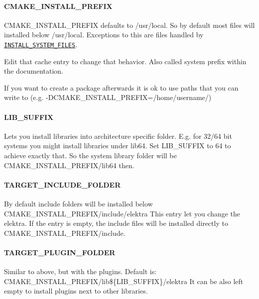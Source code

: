 \paragraph*{C\+M\+A\+K\+E\+\_\+\+I\+N\+S\+T\+A\+L\+L\+\_\+\+P\+R\+E\+F\+I\+X}

{\ttfamily C\+M\+A\+K\+E\+\_\+\+I\+N\+S\+T\+A\+L\+L\+\_\+\+P\+R\+E\+F\+I\+X} defaults to {\ttfamily /usr/local}. So by default most files will installed below {\ttfamily /usr/local}. Exceptions to this are files handled by \href{#install_system_files}{\tt I\+N\+S\+T\+A\+L\+L\+\_\+\+S\+Y\+S\+T\+E\+M\+\_\+\+F\+I\+L\+E\+S}.

Edit that cache entry to change that behavior. Also called system prefix within the documentation.

If you want to create a package afterwards it is ok to use paths that you can write to (e.\+g. {\ttfamily -\/\+D\+C\+M\+A\+K\+E\+\_\+\+I\+N\+S\+T\+A\+L\+L\+\_\+\+P\+R\+E\+F\+I\+X=/home/username/})

\paragraph*{L\+I\+B\+\_\+\+S\+U\+F\+F\+I\+X}

Lets you install libraries into architecture specific folder. E.\+g. for 32/64 bit systems you might install libraries under lib64. Set L\+I\+B\+\_\+\+S\+U\+F\+F\+I\+X to 64 to achieve exactly that. So the system library folder will be C\+M\+A\+K\+E\+\_\+\+I\+N\+S\+T\+A\+L\+L\+\_\+\+P\+R\+E\+F\+I\+X/lib64 then.

\paragraph*{T\+A\+R\+G\+E\+T\+\_\+\+I\+N\+C\+L\+U\+D\+E\+\_\+\+F\+O\+L\+D\+E\+R}

By default include folders will be installed below C\+M\+A\+K\+E\+\_\+\+I\+N\+S\+T\+A\+L\+L\+\_\+\+P\+R\+E\+F\+I\+X/include/elektra This entry let you change the elektra. If the entry is empty, the include files will be installed directly to C\+M\+A\+K\+E\+\_\+\+I\+N\+S\+T\+A\+L\+L\+\_\+\+P\+R\+E\+F\+I\+X/include.

\paragraph*{T\+A\+R\+G\+E\+T\+\_\+\+P\+L\+U\+G\+I\+N\+\_\+\+F\+O\+L\+D\+E\+R}

Similar to above, but with the plugins. Default is\+: C\+M\+A\+K\+E\+\_\+\+I\+N\+S\+T\+A\+L\+L\+\_\+\+P\+R\+E\+F\+I\+X/lib\$\{L\+I\+B\+\_\+\+S\+U\+F\+F\+I\+X\}/elektra It can be also left empty to install plugins next to other libraries.

